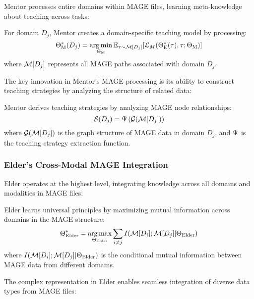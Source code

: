 Mentor processes entire domains within MAGE files, learning meta-knowledge about teaching across tasks:

\begin{theorem}
For domain $D_j$, Mentor creates a domain-specific teaching model by processing:
\begin{equation}
\Theta_{\text{M}}^{*}(D_j) = \mathop{\mathrm{arg\,min}}_{\Theta_{\text{M}}} \mathbb{E}_{\tau \sim \mathcal{M}[D_j]} [\mathcal{L}_M(\Theta_{\text{E}}^{*}(\tau), \tau; \Theta_{\text{M}})]
\end{equation}
where $\mathcal{M}[D_j]$ represents all MAGE paths associated with domain $D_j$.
\end{theorem}

The key innovation in Mentor's MAGE processing is its ability to construct teaching strategies by analyzing the structure of related data:

\begin{proposition}
Mentor derives teaching strategies by analyzing MAGE node relationships:
\begin{equation}
\mathcal{S}(D_j) = \Psi\left(\mathcal{G}(\mathcal{M}[D_j])\right)
\end{equation}
where $\mathcal{G}(\mathcal{M}[D_j])$ is the graph structure of MAGE data in domain $D_j$, and $\Psi$ is the teaching strategy extraction function.
\end{proposition}

\subsubsection{Elder's Cross-Modal MAGE Integration}

Elder operates at the highest level, integrating knowledge across all domains and modalities in MAGE files:

\begin{theorem}
Elder learns universal principles by maximizing mutual information across domains in the MAGE structure:
\begin{equation}
\Theta_{\text{Elder}}^* = \mathop{\mathrm{arg\,max}}_{\Theta_{\text{Elder}}} \sum_{i \neq j} I(\mathcal{M}[D_i]; \mathcal{M}[D_j] | \Theta_{\text{Elder}})
\end{equation}
where $I(\mathcal{M}[D_i]; \mathcal{M}[D_j] | \Theta_{\text{Elder}})$ is the conditional mutual information between MAGE data from different domains.
\end{theorem}

The complex representation in Elder enables seamless integration of diverse data types from MAGE files:

